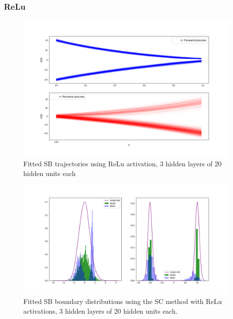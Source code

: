 \documentclass[a4paper,12pt,twoside,openright]{report}
\theoremstyle{definition}
\begin{document}
\subsubsection{ReLu}
\begin{figure}
    \centering
    \includegraphics[scale=0.4,trim={2.3cm 1cm 2.5cm 0}, clip]{images/Control/bimod_final_relu_trajectories.png}
    \caption{ Fitted SB  trajectories using ReLu activation, 3 hidden layers of 20 hidden units each}
    \label{fig:trajectoriesbimodrelunn}
\end{figure}
\begin{figure}
    \centering
    \includegraphics[scale=0.4,trim={2.3cm 1cm 2.5cm 0}, clip]{images/Control/bimod_final_relu_boundaires.png}
    \caption{ Fitted SB  boundary distributions using the SC method with ReLu activations, 3 hidden layers of 20 hidden units each.}
    \label{fig:boundsbimodrelunn}
\end{figure}
\end{document}
